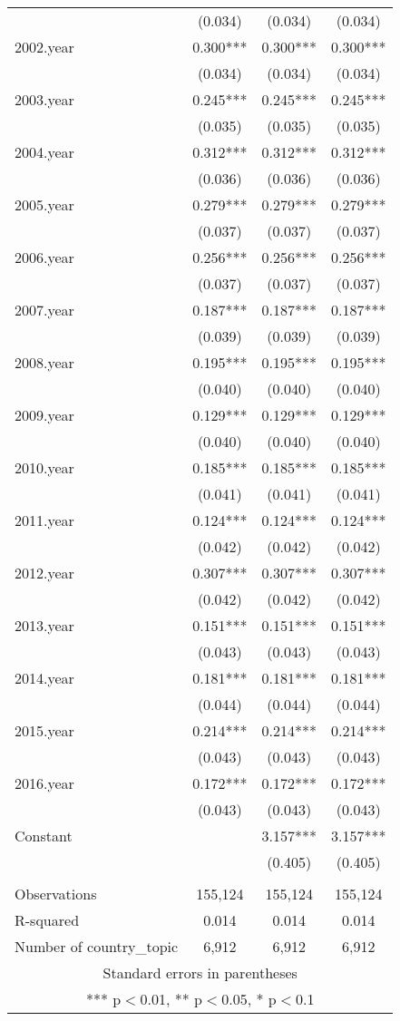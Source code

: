 \documentclass[]{article}
\begin{document}
\begin{tabular}{lccc}
 & (0.034) & (0.034) & (0.034) \\
2002.year & 0.300*** & 0.300*** & 0.300*** \\
 & (0.034) & (0.034) & (0.034) \\
2003.year & 0.245*** & 0.245*** & 0.245*** \\
 & (0.035) & (0.035) & (0.035) \\
2004.year & 0.312*** & 0.312*** & 0.312*** \\
 & (0.036) & (0.036) & (0.036) \\
2005.year & 0.279*** & 0.279*** & 0.279*** \\
 & (0.037) & (0.037) & (0.037) \\
2006.year & 0.256*** & 0.256*** & 0.256*** \\
 & (0.037) & (0.037) & (0.037) \\
2007.year & 0.187*** & 0.187*** & 0.187*** \\
 & (0.039) & (0.039) & (0.039) \\
2008.year & 0.195*** & 0.195*** & 0.195*** \\
 & (0.040) & (0.040) & (0.040) \\
2009.year & 0.129*** & 0.129*** & 0.129*** \\
 & (0.040) & (0.040) & (0.040) \\
2010.year & 0.185*** & 0.185*** & 0.185*** \\
 & (0.041) & (0.041) & (0.041) \\
2011.year & 0.124*** & 0.124*** & 0.124*** \\
 & (0.042) & (0.042) & (0.042) \\
2012.year & 0.307*** & 0.307*** & 0.307*** \\
 & (0.042) & (0.042) & (0.042) \\
2013.year & 0.151*** & 0.151*** & 0.151*** \\
 & (0.043) & (0.043) & (0.043) \\
2014.year & 0.181*** & 0.181*** & 0.181*** \\
 & (0.044) & (0.044) & (0.044) \\
2015.year & 0.214*** & 0.214*** & 0.214*** \\
 & (0.043) & (0.043) & (0.043) \\
2016.year & 0.172*** & 0.172*** & 0.172*** \\
 & (0.043) & (0.043) & (0.043) \\
Constant &  & 3.157*** & 3.157*** \\
 &  & (0.405) & (0.405) \\
 &  &  &  \\
Observations & 155,124 & 155,124 & 155,124 \\
R-squared & 0.014 & 0.014 & 0.014 \\
 Number of country\_topic & 6,912 & 6,912 & 6,912 \\ \hline
\multicolumn{4}{c}{ Standard errors in parentheses} \\
\multicolumn{4}{c}{ *** p$<$0.01, ** p$<$0.05, * p$<$0.1} \\
\end{tabular}
\end{document}
